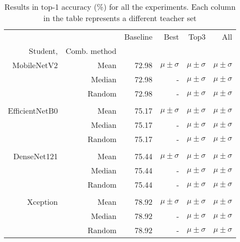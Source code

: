 \documentclass{elsarticle}
\begin{document}
	\begin{table}[h]
	\small
	\centering
	\caption{Results in top-1 accuracy (\%) for all the experiments. Each column in the table represents a different teacher set}
	\begin{tabular}{rrrrrr}\toprule
		& &Baseline &Best &Top3 &All \\
		Student, &Comb. method & & & & \\\midrule
		MobileNetV2 &Mean &72.98 &$\mu \pm \sigma$ &$\mu \pm \sigma$ &$\mu \pm \sigma$ \\
		&Median &72.98 &- &$\mu \pm \sigma$ &$\mu \pm \sigma$ \\
		&Random &72.98 &- &$\mu \pm \sigma$ &$\mu \pm \sigma$ \\
		& & & & & \\
		EfficientNetB0 &Mean &75.17 &$\mu \pm \sigma$ &$\mu \pm \sigma$ &$\mu \pm \sigma$ \\
		&Median &75.17 &- &$\mu \pm \sigma$ &$\mu \pm \sigma$ \\
		&Random &75.17 &- &$\mu \pm \sigma$ &$\mu \pm \sigma$ \\
		& & & & & \\
		DenseNet121 &Mean &75.44 &$\mu \pm \sigma$ &$\mu \pm \sigma$ &$\mu \pm \sigma$ \\
		&Median &75.44 &- &$\mu \pm \sigma$ &$\mu \pm \sigma$ \\
		&Random &75.44 &- &$\mu \pm \sigma$ &$\mu \pm \sigma$ \\
		& & & & & \\
		Xception &Mean &78.92 &$\mu \pm \sigma$ &$\mu \pm \sigma$ &$\mu \pm \sigma$ \\
		&Median &78.92 &- &$\mu \pm \sigma$ &$\mu \pm \sigma$ \\
		&Random &78.92 &- &$\mu \pm \sigma$ &$\mu \pm \sigma$ \\
		\bottomrule
	\end{tabular}
	\end{table}
\end{document}
